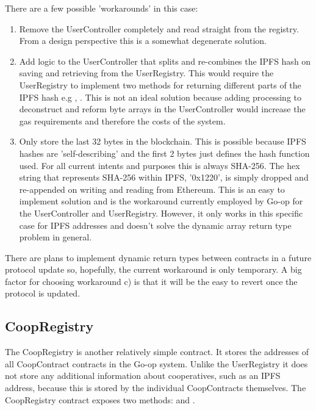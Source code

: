There are a few possible 'workarounds' in this case:\\

\begin{enumerate}[label=(\alph*)]
\item Remove the UserController completely and read straight from the registry. From a design perspective this is a somewhat degenerate solution. \\

\item Add logic to the UserController that splits and re-combines the IPFS hash on saving and retrieving from the UserRegistry. This would require the UserRegistry to implement two methods for returning different parts of the IPFS hash e.g , . This is not an ideal solution because adding processing to deconstruct and reform byte arrays in the UserController would increase the gas requirements and therefore the costs of the system. \\

\item Only store the last 32 bytes in the blockchain. This is possible because IPFS hashes are 'self-describing' and the first 2 bytes just defines the hash function used. For all current intents and purposes this is always SHA-256. The hex string that represents SHA-256 within IPFS, '0x1220', is simply dropped and re-appended on writing and reading from Ethereum. This is an easy to implement solution and is the workaround currently employed by Go-op for the UserController and UserRegistry. However, it only works in this specific case for IPFS addresses and doesn't solve the dynamic array return type problem in general.\\
\end{enumerate}

There are plans to implement dynamic return types between contracts in a future protocol update so, hopefully, the current workaround is only temporary\cite{ReturnArray}. A big factor for choosing workaround c) is that it will be the easy to revert once the protocol is updated.\\

\subsection{CoopRegistry}
The CoopRegistry is another relatively simple contract. It stores the addresses of all CoopContract contracts in the Go-op system. Unlike the UserRegistry it does not store any additional information about cooperatives, such as an IPFS address, because this is stored by the individual CoopContracts themselves. The CoopRegistry contract exposes two methods:  and . \\

